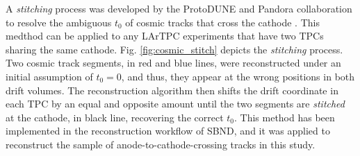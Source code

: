 A \textit{stitching} process was developed by the ProtoDUNE and Pandora collaboration to resolve the ambiguous $t_{0}$ of cosmic tracks that cross the cathode \cite{pandora_protodune}.
This medthod can be applied to any LArTPC experiments that have two TPCs sharing the same cathode.
Fig. \ref{fig:cosmic_stitch} depicts the \textit{stitching} process.
Two cosmic track segments, in red and blue lines, were reconstructed under an initial assumption of $t_{0} = 0$, and thus, they appear at the wrong positions in both drift volumes.
The reconstruction algorithm then shifts the drift coordinate in each TPC by an equal and opposite amount until the two segments are \textit{stitched} at the cathode, in black line, recovering the correct $t_{0}$.
This method has been implemented in the reconstruction workflow of SBND, and it was applied to reconstruct the sample of anode-to-cathode-crossing tracks in this study.

